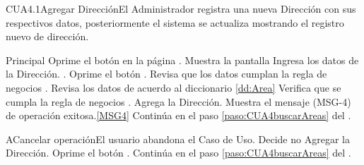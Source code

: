 	\begin{UseCase}{CUA4.1}{Agregar Dirección}{El Administrador registra una nueva Dirección con sus respectivos datos, posteriormente el sistema se actualiza mostrando el registro nuevo de dirección.}
	\end{UseCase}

	\begin{UCtrayectoria}{Principal}
			\UCpaso[\UCactor] Oprime el botón  en la página .
			\UCpaso Muestra la pantalla  
			\UCpaso [\UCactor] Ingresa los datos de la Dirección.  \label{paso:CUA4.1ingresarDatos}.
			\UCpaso [\UCactor] Oprime el botón .
			\UCpaso Revisa que los datos cumplan la regla de negocios . 
			\UCpaso Revisa los datos de acuerdo al diccionario \ref{dd:Area} 
			\UCpaso Verifica que se cumpla la regla de negocios .  
			\UCpaso Agrega la Dirección.
			\UCpaso Muestra el mensaje (MSG-4) de operación exitosa.\ref{MSG4}
			\UCpaso Continúa en el paso \ref{paso:CUA4buscarAreas} del .
	\end{UCtrayectoria}
	\newpage
	\begin{UCtrayectoriaA}{A}{Cancelar operación}{El usuario abandona el Caso de Uso.}
			\UCpaso[\UCactor] Decide no Agregar la Dirección.
			\UCpaso[\UCactor] Oprime el botón .
			\UCpaso Continúa en el paso \ref{paso:CUA4buscarAreas} del .
	\end{UCtrayectoriaA}
		
